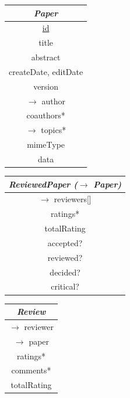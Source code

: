 \documentclass[a4paper, 12pt]{scrartcl}
\begin{document}
    \begin{tabular}{|c|}
      \hline
      \emph{Paper} \\
      \hline
      \underline{id} \\
      title \\
      abstract \\
      createDate, editDate \\
      version \\
      $\longrightarrow$ author \\
      coauthors* \\
      $\longrightarrow$ topics* \\
      mimeType \\
      data \\
      \hline
    \end{tabular}
    \begin{tabular}{|c|}
      \hline
      \emph{ReviewedPaper ($\rightarrow$ Paper)} \\
      \hline
      $\longrightarrow$ reviewers[] \\
      ratings* \\
      totalRating \\
      accepted? \\
      reviewed? \\
      decided? \\
      critical? \\
      \hline
    \end{tabular}
    \begin{tabular}{|c|}
      \hline
      \emph{Review} \\
      \hline
      $\longrightarrow$ reviewer \\
      $\longrightarrow$ paper \\
      ratings* \\
      comments* \\
      totalRating \\
      \hline
    \end{tabular}
\end{document}
